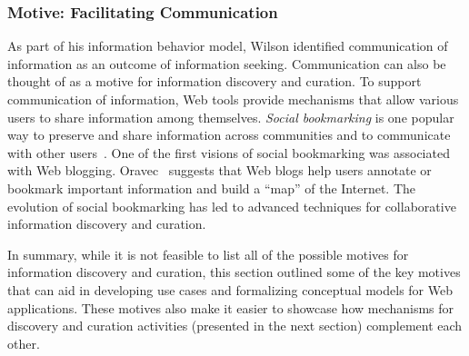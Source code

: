 \documentclass[review]{elsarticle}
\begin{document}
{{{}

{\subsubsection{Motive: Facilitating Communication}
As part of his information behavior model, Wilson identified communication of information as an outcome of information seeking. Communication can also be thought of as a motive for information discovery and curation. To support communication of information, Web tools provide mechanisms that allow various users to share information among themselves. 
%
\textit{Social bookmarking} is one popular way to preserve and share information across communities and to communicate with other users~\cite{estelles2010social}. One of the first visions of social bookmarking was associated with Web blogging. Oravec~\cite{oravec2002bookmarking} suggests that Web blogs help users annotate or bookmark important information and build a ``map'' of the Internet. The evolution of social bookmarking has led to advanced techniques for collaborative information discovery and curation. 
}

In summary, while it is not feasible to list all of the possible motives for information discovery and curation, this section outlined some of the key motives that can aid in developing use cases and formalizing conceptual models for Web applications. These motives also make it easier to showcase how mechanisms for discovery and curation activities (presented in the next section) complement each other.
} 
}
\end{document}
